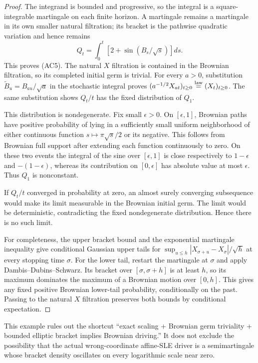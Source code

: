 \documentclass[11pt]{article}
\theoremstyle{definition}\newtheorem{definition}[theorem]{Definition}
\theoremstyle{remark}\newtheorem{remark}[theorem]{Remark}
\begin{document}
\begin{proof}
The integrand is bounded and progressive, so the integral is a
square-integrable martingale on each finite horizon. A martingale
remains a martingale in its own smaller natural filtration; its
bracket is the pathwise quadratic variation and hence remains
\[
 Q_t=\int_0^t[2+\sin(B_s/\sqrt s)]ds.
\]
This proves (AC5). The natural $X$ filtration is contained in the
Brownian filtration, so its completed initial germ is trivial.
For every $a>0$, substitution $\widetilde B_u=B_{au}/\sqrt a$
in the stochastic integral proves
$(a^{-1/2}X_{at})_{t\ge0}\stackrel{\rm law}=(X_t)_{t\ge0}$.
The same substitution shows $Q_t/t$ has the fixed distribution of
$Q_1$.

This distribution is nondegenerate. Fix small $\epsilon>0$.
On $[\epsilon,1]$, Brownian paths have positive probability of lying
in a sufficiently small uniform neighborhood of either continuous
function $s\mapsto\pi\sqrt s/2$ or its negative. This follows from
Brownian full support after extending each function continuously to
zero. On these two events the integral of the sine over
$[\epsilon,1]$ is close respectively to $1-\epsilon$ and
$-(1-\epsilon)$, whereas its contribution on $[0,\epsilon]$ has
absolute value at most $\epsilon$. Thus $Q_1$ is nonconstant.

If $Q_t/t$ converged in probability at zero, an almost surely
converging subsequence would make its limit measurable in the
Brownian initial germ. The limit would be deterministic, contradicting
the fixed nondegenerate distribution. Hence there is no such limit.

For completeness, the upper bracket bound and the exponential
martingale inequality give conditional Gaussian upper tails for
$\sup_{u\le h}|X_{\sigma+u}-X_\sigma|/\sqrt h$ at every
stopping time $\sigma$. For the lower tail, restart the martingale
at $\sigma$ and apply Dambis--Dubins--Schwarz. Its bracket over
$[\sigma,\sigma+h]$ is at least $h$, so its maximum dominates
the maximum of a Brownian motion over $[0,h]$. This gives any fixed
positive Brownian lower-tail probability, conditionally on the
past. Passing to the natural $X$ filtration preserves both bounds
by conditional expectation.
\end{proof}

This example rules out the shortcut ``exact scaling + Brownian
germ triviality + bounded elliptic bracket implies Brownian
driving.'' It does not exclude the possibility that the actual
wrong-coordinate affine-SLE driver is a semimartingale whose bracket
density oscillates on every logarithmic scale near zero.
\end{document}
